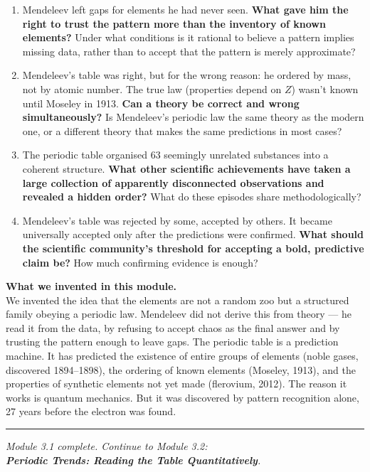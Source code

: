 \documentclass[12pt, a4paper]{book}
\begin{document}
\begin{reflectionbox}
\begin{enumerate}[label=\textbf{R\arabic*.}]
  \item Mendeleev left gaps for elements he had never seen.
        \textbf{What gave him the right to trust the pattern
        more than the inventory of known elements?}
        Under what conditions is it rational to believe
        a pattern implies missing data, rather than to
        accept that the pattern is merely approximate?

  \item Mendeleev's table was right, but for the wrong
        reason: he ordered by mass, not by atomic number.
        The true law (properties depend on $Z$) wasn't known
        until Moseley in 1913.
        \textbf{Can a theory be correct and wrong simultaneously?}
        Is Mendeleev's periodic law the same theory as the
        modern one, or a different theory that makes the
        same predictions in most cases?

  \item The periodic table organised 63 seemingly unrelated
        substances into a coherent structure.
        \textbf{What other scientific achievements have taken
        a large collection of apparently disconnected
        observations and revealed a hidden order?}
        What do these episodes share methodologically?

  \item Mendeleev's table was rejected by some, accepted by
        others.
        It became universally accepted only after the
        predictions were confirmed.
        \textbf{What should the scientific community's
        threshold for accepting a bold, predictive claim be?}
        How much confirming evidence is enough?
\end{enumerate}
\end{reflectionbox}

\vspace{1.5em}
\begin{center}
\begin{tcolorbox}[enhanced, colback=DiscoveryColor!8, colframe=DiscoveryColor,
  width=0.88\textwidth, arc=3pt]
\centering\sffamily\small
\textbf{What we invented in this module.}\\[4pt]
We invented the idea that the elements are not a random zoo
but a structured family obeying a periodic law.
Mendeleev did not derive this from theory --- he read it
from the data, by refusing to accept chaos as the final
answer and by trusting the pattern enough to leave gaps.
The periodic table is a prediction machine.
It has predicted the existence of entire groups of elements
(noble gases, discovered 1894--1898), the ordering of known
elements (Moseley, 1913), and the properties of synthetic
elements not yet made (flerovium, 2012).
The reason it works is quantum mechanics.
But it was discovered by pattern recognition alone,
27 years before the electron was found.
\end{tcolorbox}
\end{center}

\vspace{2em}
\noindent\textcolor{JourneyColor!40}{\rule{\textwidth}{0.6pt}}
\begin{center}
\textit{\sffamily\small
Module 3.1 complete. Continue to Module 3.2:\\
\textbf{Periodic Trends: Reading the Table Quantitatively}.}
\end{center}
\end{document}

